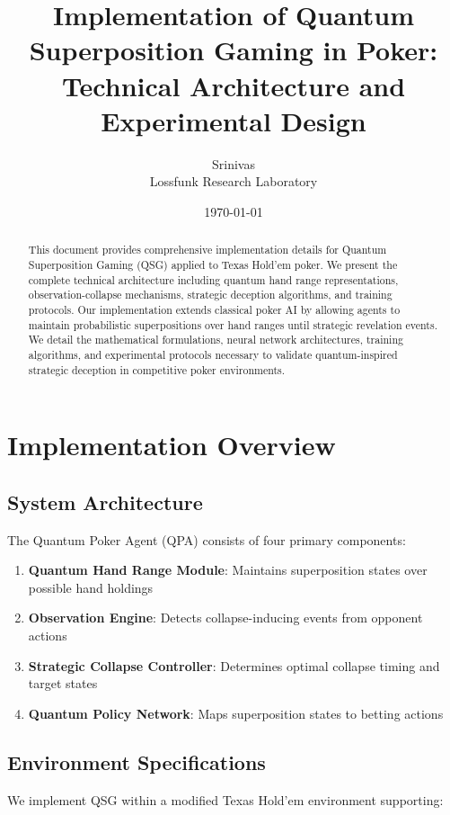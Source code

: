 \documentclass[11pt,a4paper]{article}
\title{\textbf{Implementation of Quantum Superposition Gaming in Poker:\\Technical Architecture and Experimental Design}}
\author{Srinivas\\Lossfunk Research Laboratory}
\date{\today}
\begin{document}
\maketitle

\begin{abstract}
This document provides comprehensive implementation details for Quantum Superposition Gaming (QSG) applied to Texas Hold'em poker. We present the complete technical architecture including quantum hand range representations, observation-collapse mechanisms, strategic deception algorithms, and training protocols. Our implementation extends classical poker AI by allowing agents to maintain probabilistic superpositions over hand ranges until strategic revelation events. We detail the mathematical formulations, neural network architectures, training algorithms, and experimental protocols necessary to validate quantum-inspired strategic deception in competitive poker environments.
\end{abstract}

\section{Implementation Overview}

\subsection{System Architecture}

The Quantum Poker Agent (QPA) consists of four primary components:

\begin{enumerate}
\item \textbf{Quantum Hand Range Module}: Maintains superposition states over possible hand holdings
\item \textbf{Observation Engine}: Detects collapse-inducing events from opponent actions
\item \textbf{Strategic Collapse Controller}: Determines optimal collapse timing and target states
\item \textbf{Quantum Policy Network}: Maps superposition states to betting actions
\end{enumerate}

\subsection{Environment Specifications}

We implement QSG within a modified Texas Hold'em environment supporting:
\end{document}
